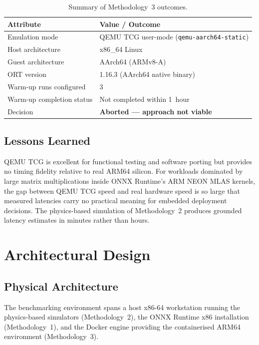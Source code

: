 \begin{table}[H]
\centering
\caption{Summary of Methodology~3 outcomes.}
\label{tab:m3_summary}
\begin{tabular}{ll}
\toprule
\textbf{Attribute} & \textbf{Value / Outcome} \\
\midrule
Emulation mode            & QEMU TCG user-mode (\texttt{qemu-aarch64-static}) \\
Host architecture         & x86\_64 Linux \\
Guest architecture        & AArch64 (ARMv8-A) \\
ORT version               & 1.16.3 (AArch64 native binary) \\
Warm-up runs configured   & 3 \\
Warm-up completion status & Not completed within 1~hour \\
Decision                  & \textbf{Aborted --- approach not viable} \\
\bottomrule
\end{tabular}
\end{table}

\subsection{Lessons Learned}

QEMU TCG is excellent for functional testing and software porting but provides
no timing fidelity relative to real ARM64 silicon. For workloads dominated by
large matrix multiplications inside ONNX Runtime's ARM NEON MLAS kernels, the
gap between QEMU TCG speed and real hardware speed is so large that measured
latencies carry no practical meaning for embedded deployment decisions. The
physics-based simulation of Methodology~2 produces grounded latency estimates
in minutes rather than hours.

\section{Architectural Design}
\label{sec:architectural_design}

\subsection{Physical Architecture}

The benchmarking environment spans a host x86-64 workstation running the
physics-based simulators (Methodology~2), the ONNX Runtime x86 installation
(Methodology~1), and the Docker engine providing the containerised ARM64
environment (Methodology~3).

